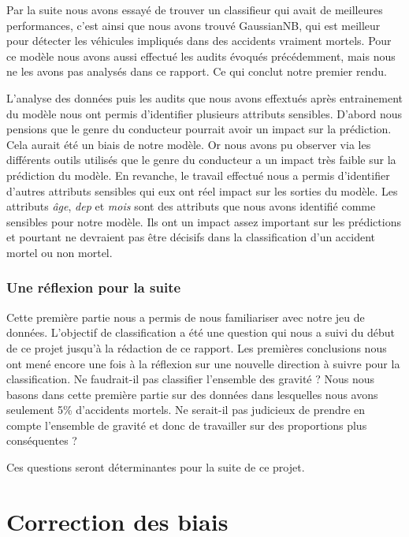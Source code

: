 \documentclass{article}
\begin{document}
    Par la suite nous avons essayé de trouver un classifieur qui avait de meilleures performances, c'est ainsi que nous avons trouvé GaussianNB, qui
    est meilleur pour détecter les véhicules impliqués dans des accidents vraiment mortels. Pour ce modèle nous avons aussi effectué les audits 
    évoqués précédemment, mais nous ne les avons pas analysés dans ce rapport. Ce qui conclut notre premier rendu. 

    L'analyse des données puis les audits que nous avons effextués après entrainement du modèle nous ont permis d'identifier 
    plusieurs attributs sensibles. D'abord nous pensions que le genre du conducteur pourrait avoir un impact sur la prédiction. 
    Cela aurait été un biais de notre modèle. Or nous avons pu observer via les différents outils utilisés que le genre du 
    conducteur a un impact très faible sur la prédiction du modèle. En revanche, le travail effectué nous a permis d'identifier 
    d'autres attributs sensibles qui eux ont réel impact sur les sorties du modèle. Les attributs \textit{âge}, \textit{dep} et 
    \textit{mois} sont des attributs que nous avons identifié comme sensibles pour notre modèle. Ils ont un impact assez important 
    sur les prédictions et pourtant ne devraient pas être décisifs dans la classification d'un accident mortel ou non mortel.

    \section{Une réflexion pour la suite}
    Cette première partie nous a permis de nous familiariser avec notre jeu de données. L'objectif de classification a été une 
    question qui nous a suivi du début de ce projet jusqu'à la rédaction de ce rapport. 
    Les premières conclusions nous ont mené encore une fois à la réflexion sur une nouvelle direction à suivre pour la classification. 
    Ne faudrait-il pas classifier l'ensemble des 
    gravité ? Nous nous basons dans cette première partie sur des données dans lesquelles nous avons seulement 5\% d'accidents 
    mortels. Ne serait-il pas judicieux de prendre en compte l'ensemble de gravité et donc de travailler sur des proportions 
    plus conséquentes ?

    Ces questions seront déterminantes pour la suite de ce projet.

    \newpage
    \part{Correction des biais}
\end{document}
